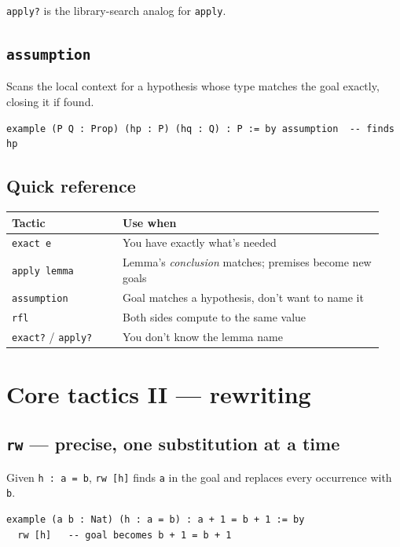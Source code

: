 \texttt{apply?} is the library-search analog for \texttt{apply}.

\subsection{\texttt{assumption}}

Scans the local context for a hypothesis whose type matches the goal exactly, closing it if found.

\begin{verbatim}
example (P Q : Prop) (hp : P) (hq : Q) : P := by assumption  -- finds hp
\end{verbatim}

\subsection{Quick reference}

\begin{center}
\begin{tabular}{@{}p{0.28\linewidth}p{0.66\linewidth}@{}}
\hline
\textbf{Tactic} & \textbf{Use when} \\
\hline
\texttt{exact e} & You have exactly what's needed \\
\texttt{apply lemma} & Lemma's \emph{conclusion} matches; premises become new goals \\
\texttt{assumption} & Goal matches a hypothesis, don't want to name it \\
\texttt{rfl} & Both sides compute to the same value \\
\texttt{exact?} / \texttt{apply?} & You don't know the lemma name \\
\hline
\end{tabular}
\end{center}

\section{Core tactics II --- rewriting}

\subsection{\texttt{rw} --- precise, one substitution at a time}

Given \texttt{h : a = b}, \texttt{rw [h]} finds \texttt{a} in the goal and replaces every occurrence with \texttt{b}.

\begin{verbatim}
example (a b : Nat) (h : a = b) : a + 1 = b + 1 := by
  rw [h]   -- goal becomes b + 1 = b + 1
\end{verbatim}

